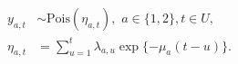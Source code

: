 \begin{align}
  y_{a, t} &\sim \text{Pois}(\eta_{a, t}), \,\, a \in \{1, 2\}, t \in U,
  \label{eqn:thinned-poisson-process-one}
  \\
  \eta_{a, t} &= \sum_{u = 1}^{t} \lambda_{a, u} \exp\{-\mu_{a}(t - u)\}.
  \label{eqn:thinned-poisson-process-two}
\end{align}